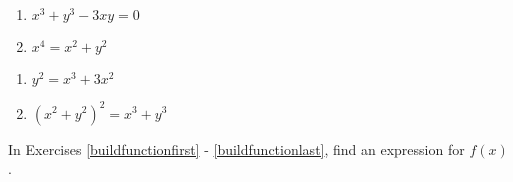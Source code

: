 {\begin{multicols}{2}
\begin{enumerate}
\setcounter{enumi}{\value{HW}}

\item $x^{3} + y^{3} - 3xy = 0$ \label{notfuncequfirst}
\item $x^{4} = x^{2} + y^{2}$ 

\setcounter{HW}{\value{enumi}}
\end{enumerate}
\end{multicols}

\begin{multicols}{2}
\begin{enumerate}
\setcounter{enumi}{\value{HW}}


\item $y^{2} = x^{3} + 3x^{2}$ 
\item $(x^{2} + y^{2})^{2} = x^{3} + y^{3}$ \label{notfuncequlast}

\setcounter{HW}{\value{enumi}}
\end{enumerate}
\end{multicols}
} %

In Exercises \ref{buildfunctionfirst} - \ref{buildfunctionlast}, find an expression for $f(x)$.

